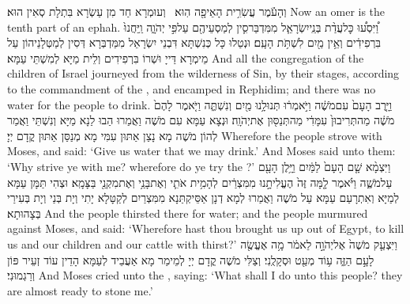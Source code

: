 {וְהָעֹ֕מֶר עֲשִׂרִ֥ית הָאֵיפָ֖ה הֽוּא׃ \petucha }
{וְעוּמְרָא חַד מִן עַשְׂרָא בִּתְלָת סְאִין הוּא׃}
{Now an omer is the tenth part of an ephah.}{}
\newperek
{}%
{וַ֠יִּסְע֠וּ כׇּל\maqqaf עֲדַ֨ת בְּנֵֽי\maqqaf יִשְׂרָאֵ֧ל מִמִּדְבַּר\maqqaf סִ֛ין לְמַסְעֵיהֶ֖ם עַל\maqqaf פִּ֣י יְהֹוָ֑ה וַֽיַּחֲנוּ֙ בִּרְפִידִ֔ים וְאֵ֥ין מַ֖יִם לִשְׁתֹּ֥ת הָעָֽם׃}
{וּנְטַלוּ כָּל כְּנִשְׁתָּא דִּבְנֵי יִשְׂרָאֵל מִמַּדְבְּרָא דְּסִין לְמַטְּלָנֵיהוֹן עַל מֵימְרָא דַּייָ וּשְׁרוֹ בִּרְפִידִים וְלֵית מַיָּא לְמִשְׁתֵּי עַמָּא׃}
{And all the congregation of the children of Israel journeyed from the wilderness of Sin, by their stages, according to the commandment of the \lord, and encamped in Rephidim; and there was no water for the people to drink.}{}
{וַיָּ֤רֶב הָעָם֙ עִם\maqqaf מֹשֶׁ֔ה וַיֹּ֣אמְר֔וּ תְּנוּ\maqqaf לָ֥נוּ מַ֖יִם וְנִשְׁתֶּ֑ה וַיֹּ֤אמֶר לָהֶם֙ מֹשֶׁ֔ה מַה\maqqaf תְּרִיבוּן֙ עִמָּדִ֔י מַה\maqqaf תְּנַסּ֖וּן אֶת\maqqaf יְהֹוָֽה׃}
{וּנְצָא עַמָּא עִם מֹשֶׁה וַאֲמַרוּ הַבוּ לַנָא מַיָּא וְנִשְׁתֵּי וַאֲמַר לְהוֹן מֹשֶׁה מָא נָצַן אַתּוּן עִמִּי מָא מְנַסַּן אַתּוּן קֳדָם יְיָ׃}
{Wherefore the people strove with Moses, and said: ‘Give us water that we may drink.’ And Moses said unto them: ‘Why strive ye with me? wherefore do ye try the \lord?’}{}
{וַיִּצְמָ֨א שָׁ֤ם הָעָם֙ לַמַּ֔יִם וַיָּ֥לֶן הָעָ֖ם עַל\maqqaf מֹשֶׁ֑ה וַיֹּ֗אמֶר לָ֤מָּה זֶּה֙ הֶעֱלִיתָ֣נוּ מִמִּצְרַ֔יִם לְהָמִ֥ית אֹתִ֛י וְאֶת\maqqaf בָּנַ֥י וְאֶת\maqqaf מִקְנַ֖י בַּצָּמָֽא׃}
{וּצְהִי תַּמָּן עַמָּא לְמַיָּא וְאִתְרָעַם עַמָּא עַל מֹשֶׁה וַאֲמַרוּ לְמָא דְנָן אַסֵּיקְתַּנָא מִמִּצְרַיִם לְקַטָּלָא יָתִי וְיָת בְּנַי וְיָת בְּעִירַי בְּצָהוּתָא׃}
{And the people thirsted there for water; and the people murmured against Moses, and said: ‘Wherefore hast thou brought us up out of Egypt, to kill us and our children and our cattle with thirst?’}{}
{וַיִּצְעַ֤ק מֹשֶׁה֙ אֶל\maqqaf יְהֹוָ֣ה לֵאמֹ֔ר מָ֥ה אֶעֱשֶׂ֖ה לָעָ֣ם הַזֶּ֑ה ע֥וֹד מְעַ֖ט וּסְקָלֻֽנִי׃}
{וְצַלִּי מֹשֶׁה קֳדָם יְיָ לְמֵימַר מָא אַעֲבֵיד לְעַמָּא הָדֵין עוֹד זְעֵיר פּוֹן וְרַגְמוּנִי׃}
{And Moses cried unto the \lord, saying: ‘What shall I do unto this people? they are almost ready to stone me.’}{}
